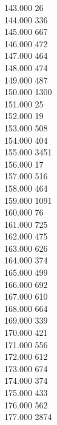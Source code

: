 { 143.000	26 \\
 144.000	336 \\
 145.000	667 \\
 146.000	472 \\
 147.000	464 \\
 148.000	474 \\
 149.000	487 \\
 150.000	1300 \\
 151.000	25 \\
 152.000	19 \\
 153.000	508 \\
 154.000	404 \\
 155.000	3451 \\
 156.000	17 \\
 157.000	516 \\
 158.000	464 \\
 159.000	1091 \\
 160.000	76 \\
 161.000	725 \\
 162.000	475 \\
 163.000	626 \\
 164.000	374 \\
 165.000	499 \\
 166.000	692 \\
 167.000	610 \\
 168.000	664 \\
 169.000	339 \\
 170.000	421 \\
 171.000	556 \\
 172.000	612 \\
 173.000	674 \\
 174.000	374 \\
 175.000	433 \\
 176.000	562 \\
 177.000	2874 \\
}

